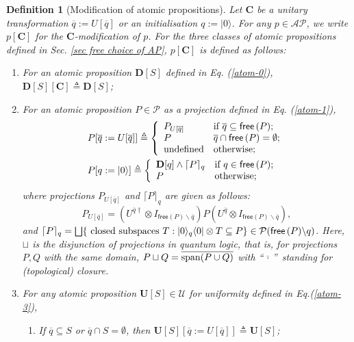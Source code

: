 \documentclass[conference,compsoc, 10pt]{IEEEtran}
\newtheorem{definition}{Definition}[section]
\newcommand {\qbar} {{\overline{q}}}
\newcommand {\qI} {{q:=|0\rangle}}
\newcommand {\qU} {{\overline{q}:=U[\overline{q}]}}
\newcommand {\cP } {{\mathcal{P}}}
\newcommand {\cH } {{\mathcal{H}}}
\newcommand {\cU } {{\mathcal{U}}}
\newcommand {\cE } {{\mathcal{E}}}
\newcommand {\id } {{I}}
\newcommand {\bD} {{\mathbf{D}}}
\newcommand {\free }[1] {{\mathsf{free}\left(#1\right)}}
\newcommand {\unia } {{\mathbf{U}}}
\newcommand {\prog } {{\mathbf{C}}}
\newcommand {\AP} {{\mathcal{AP}}}
\newcommand {\spa } {{\rm span}}
\def\>{\ensuremath{\rangle}}
\def\<{\ensuremath{\langle}}
\newcommand{\qvee}{\sqcup}
\newcommand{\qbigvee}{\bigsqcup}
\begin{document}
	\begin{definition}[Modification of atomic propositions]
		\label{def sub atomic prop}
    Let $\prog$ be a unitary transformation $\qU$ or an initialisation $\qI$.
    For any $p\in\AP$, we write $p[\prog]$ for the $\prog$-modification of $p$.
    For the three classes of  atomic propositions defined in Sec. \ref{sec free choice of
    AP},  $p[\prog]$ is defined as follows:
	\begin{enumerate}
			\item For an atomic proposition $\bD[S]$ defined in Eq. (\ref{atom-0}), $\bD[S][\prog] \triangleq \bD[S]$;
			\item %
			For an atomic  proposition  $P\in\cP$ as a   projection defined in Eq. (\ref{atom-1}), 
		\begin{align*}
			&P[\qU]\triangleq\left\{
			\begin{array}{ll}
			P_{U[\qbar]} & \text{if}\ \qbar\subseteq\free{P}; \\
			P &\qbar\cap\free{P}=\emptyset; \\
			{\rm undefined} & {\rm otherwise;}
			\end{array}
			\right. \\
			&P[\qI]\triangleq\left\{
			\begin{array}{ll}
			\bD[q]\wedge\lceil P\rceil_q & \text{if}\ q\in\free{P}; \\
			P &{\rm otherwise;}
			\end{array}
			\right. 
			\end{align*}
			where projections $P_{U[\qbar]}$ and $\lceil P\rceil_q$ are given as follows: $$P_{U[\qbar]} = 
	(U^{\qbar\dag}\otimes\id_{\free{P}\backslash\qbar})P(U^{\qbar}\otimes\id_{\free{P}\backslash\qbar}),$$ and
	$\lceil P\rceil_q ={\qbigvee}\{{\rm ~closed~subspaces}\ T:
     |0\>_q\<0|\otimes T\subseteq P\} \in \cP(\free{P}\backslash q)$. Here,  $\qvee$ is the disjunction of projections  in quantum logic, that is, for projections $P,Q$ with the same domain, $P\qvee Q=\overline{\operatorname{\spa}(P\cup Q)}$ with \textquotedblleft$\overline{\, \cdot\, }$\textquotedblright\ standing for (topological)  closure.
			\item For any atomic proposition $\unia[S]\in\cU$ for uniformity defined in Eq.(\ref{atom-3}), 
			\begin{enumerate}
				\item If $\qbar\subseteq S$ or $\qbar\cap S=\emptyset$, then $\unia[S][\qU] \triangleq\unia[S]$; 
				

\end{enumerate}
\end{enumerate}
\end{definition}
\end{document}
